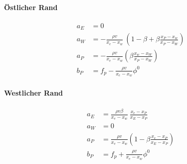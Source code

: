 \documentclass[11pt, ngerman,colorback,accentcolor=tud2d]{tudreport}
\begin{document}
\paragraph{Östlicher Rand}

\begin{align*}
  a_E &= 0\\
  a_W &=-\frac{\rho v}{x_e-x_w}\ \left({1-\beta + \beta \frac{x_P-x_w}{x_P-x_W}}\right)\\
  a_P &=-\frac{\rho v}{x_e-x_w} \left({\beta \frac{x_w-x_W}{x_P-x_W}}\right)\\
  b_P &= f_p-\frac{\rho v}{x_e-x_w} \phi^0
\end{align*}


\paragraph{Westlicher Rand}

\begin{align*}
  a_E &= \frac{\rho v \beta}{x_e-x_w}\ \frac{x_e-x_P}{x_E-x_P}\\
  a_W &=0\\
  a_P &= \frac{\rho v}{x_e-x_w} \left({1-\beta \frac{x_e-x_P}{x_E-x_P}}\right)\\
  b_P &= f_p+\frac{\rho v}{x_e-x_w} \phi^0
\end{align*}
\end{document}
